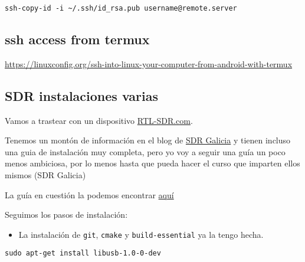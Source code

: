 \documentclass[
  12pt,
  spanish,
]{article}
\providecommand{\tightlist}{%
  \setlength{\itemsep}{0pt}\setlength{\parskip}{0pt}}
\begin{document}
\texttt{ssh-copy-id\ -i\ \textasciitilde{}/.ssh/id\_rsa.pub\ username@remote.server}

\hypertarget{ssh-access-from-termux}{%
\subsection{ssh access from termux}\label{ssh-access-from-termux}}

\url{https://linuxconfig.org/ssh-into-linux-your-computer-from-android-with-termux}

\hypertarget{sdr-instalaciones-varias}{%
\subsection{SDR instalaciones varias}\label{sdr-instalaciones-varias}}

Vamos a trastear con un dispositivo
\href{https://www.rtl-sdr.com/}{RTL-SDR.com}.

Tenemos un montón de información en el blog de
\href{https://sdrgal.wordpress.com/}{SDR Galicia} y tienen incluso una
guia de instalación muy completa, pero yo voy a seguir una guía un poco
menos ambiciosa, por lo menos hasta que pueda hacer el curso que
imparten ellos mismos (SDR Galicia)

La guía en cuestión la podemos encontrar
\href{https://ranous.wordpress.com/rtl-sdr4linux/}{aquí}

Seguimos los pasos de instalación:

\begin{itemize}
\tightlist
\item
  La instalación de \texttt{git}, \texttt{cmake} y
  \texttt{build-essential} ya la tengo hecha.
\end{itemize}

\begin{verbatim}
sudo apt-get install libusb-1.0-0-dev
\end{verbatim}
\end{document}
